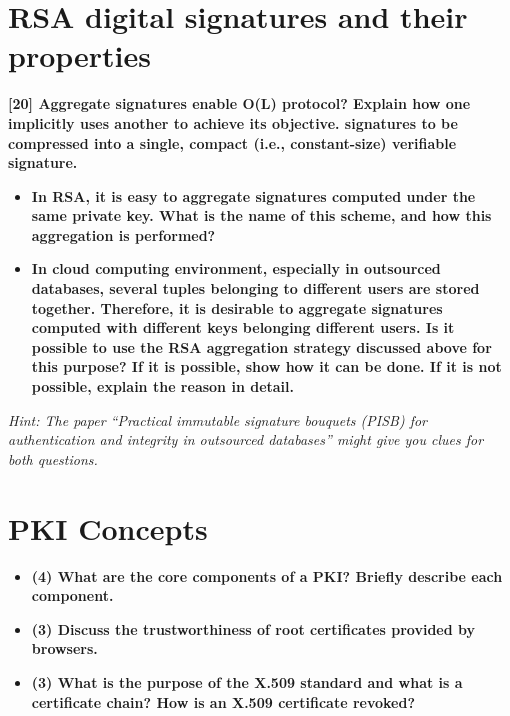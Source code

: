 \documentclass[letterpaper,11pt,notitlepage,fleqn]{article}
\begin{document}
\section{RSA digital signatures and their properties}
\noindent \textbf{[20] Aggregate  signatures  enable  O(L) 
protocol? Explain how one implicitly uses another to achieve its objective.  
signatures to be compressed into a single, compact (i.e., constant-size) verifiable signature.}
\begin{itemize}
    \item \textbf{In  RSA,  it  is  easy  to  aggregate  signatures  computed  under  the  same  private key. What is the name of this scheme, and how this aggregation is performed?}
    \item \textbf{In cloud computing environment, especially  in outsourced databases, several tuples  belonging  to  different  users  are  stored  together.  Therefore,  it  is desirable  to  aggregate  signatures  computed  with  different  keys  belonging different  users.  Is  it  possible  to  use  the  RSA  aggregation  strategy  discussed above  for  this  purpose?  If  it  is  possible,  show  how  it  can  be  done.  If  it  is  not possible, explain the reason in
        detail.}
\end{itemize}
\textit{Hint:  The  paper  “Practical  immutable  signature  bouquets  (PISB)  for authentication and integrity in outsourced databases” might give you clues for both questions.}

\section{PKI Concepts}
\begin{itemize}
    \item \textbf{(4)  What  are  the  core  components  of  a  PKI?  Briefly  describe  each component.}
    \item \textbf{(3) Discuss the trustworthiness of root certificates provided by browsers.}
    \item \textbf{(3)  What  is  the  purpose  of  the  X.509  standard  and  what  is  a  certificate chain? How is an X.509 certificate revoked?}
\end{itemize}


\medskip


\end{document}

